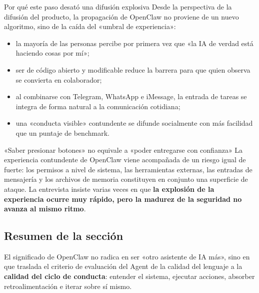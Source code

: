 \begin{knowledgebox}{Por qué este paso desató una difusión explosiva}
Desde la perspectiva de la difusión del producto, la propagación de OpenClaw no proviene de un nuevo algoritmo, sino de la caída del «umbral de experiencia»:
\begin{itemize}
    \item la mayoría de las personas percibe por primera vez que «la IA de verdad está haciendo cosas por mí»;
    \item ser de código abierto y modificable reduce la barrera para que quien observa se convierta en colaborador;
    \item al combinarse con Telegram, WhatsApp e iMessage, la entrada de tareas se integra de forma natural a la comunicación cotidiana;
    \item una «conducta visible» contundente se difunde socialmente con más facilidad que un puntaje de benchmark.
\end{itemize}
\end{knowledgebox}

\begin{warningbox}{«Saber presionar botones» no equivale a «poder entregarse con confianza»}
La experiencia contundente de OpenClaw viene acompañada de un riesgo igual de fuerte: los permisos a nivel de sistema, las herramientas externas, las entradas de mensajería y los archivos de memoria constituyen en conjunto una superficie de ataque. La entrevista insiste varias veces en que \textbf{la explosión de la experiencia ocurre muy rápido, pero la madurez de la seguridad no avanza al mismo ritmo}.
\end{warningbox}

\subsection{Resumen de la sección}
El significado de OpenClaw no radica en ser «otro asistente de IA más», sino en que traslada el criterio de evaluación del Agent de la calidad del lenguaje a la \textbf{calidad del ciclo de conducta}: entender el sistema, ejecutar acciones, absorber retroalimentación e iterar sobre sí mismo.


